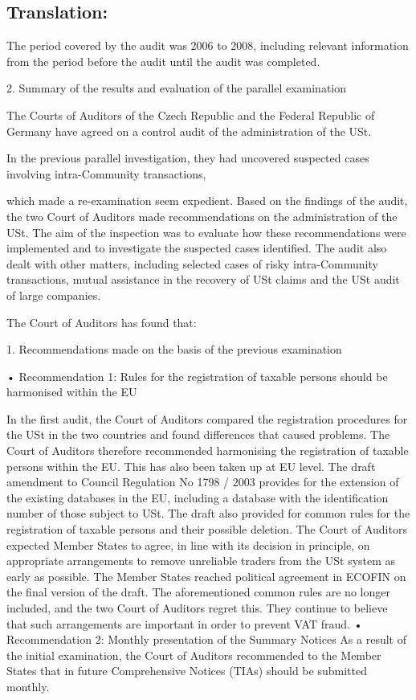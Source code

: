 \documentclass[10pt]{article}
\begin{document}
\pagebreak

\subsection*{Translation:}

The period covered by the audit was 2006 to 2008, including relevant information from the period before the audit until the audit was completed.


2. Summary of the results and evaluation of the parallel examination

The Courts of Auditors of the Czech Republic and the Federal Republic of Germany have agreed on a control audit of the administration of the USt.


In the previous parallel investigation, they had uncovered suspected cases involving intra-Community transactions,

which made a re-examination seem expedient.
Based on the findings of the audit, the two Court of Auditors made recommendations on the administration of the USt.
The aim of the inspection was to evaluate how these recommendations were implemented and to investigate the suspected cases identified.
The audit also dealt with other matters, including selected cases of risky intra-Community transactions, mutual assistance in the recovery of USt claims and the USt audit of large companies.


The Court of Auditors has found that:



1. Recommendations made on the basis of the previous examination



• Recommendation 1: Rules for the registration of taxable persons should be harmonised within the EU

In the first audit, the Court of Auditors compared the registration procedures for the USt in the two countries and found differences that caused problems.
The Court of Auditors therefore recommended harmonising the registration of taxable persons within the EU.
This has also been taken up at EU level.
The draft amendment to Council Regulation No 1798 / 2003 provides for the extension of the existing databases in the EU, including a database with the identification number of those subject to USt.
The draft also provided for common rules for the registration of taxable persons and their possible deletion.
The Court of Auditors expected Member States to agree, in line with its decision in principle, on appropriate arrangements to remove unreliable traders from the USt system as early as possible.
The Member States reached political agreement in ECOFIN on the final version of the draft.
The aforementioned common rules are no longer included, and the two Court of Auditors regret this.
They continue to believe that such arrangements are important in order to prevent VAT fraud.
• Recommendation 2: Monthly presentation of the Summary Notices As a result of the initial examination, the Court of Auditors recommended to the Member States that in future Comprehensive Notices (TIAs) should be submitted monthly.
\end{document}

